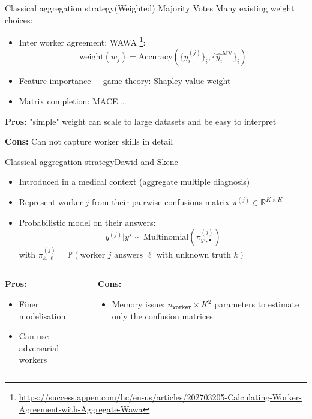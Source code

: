 \begin{frame}{Classical aggregation strategy}{(Weighted) Majority Votes}
Many existing weight choices:
\begin{itemize}[itemsep=15pt]
    \item Inter worker agreement: WAWA \footnote{\url{https://success.appen.com/hc/en-us/articles/202703205-Calculating-Worker-Agreement-with-Aggregate-Wawa}}:
    \[
    \mathrm{weight}(w_j) = \mathrm{Accuracy}(\{y_i^{(j)}\}_i, \{\hat {y_i}^\mathrm{MV}\}_i)
    \]
    \item Feature importance + game theory: Shapley-value weight
    \item Matrix completion: MACE \dots
\end{itemize}
\vspace{1cm}
\textbf{Pros:} "simple" weight can scale to large datasets and be easy to interpret

\textbf{Cons:} Can not capture worker skills in detail
\end{frame}


\begin{frame}{Classical aggregation strategy}{Dawid and Skene}
\begin{itemize}
    \item Introduced in a medical context (aggregate multiple diagnosis)
    \item Represent worker $j$ from their pairwise confusions matrix $\pi^{(j)}\in\mathbb{R}^{K\times K}$
    \item Probabilistic model on their answers:
    \[
    y^{(j)} | y^\star \sim \mathrm{Multinomial}(\pi^{(j)}_{y^\star, \bullet})
    \]
    with $\pi^{(j)}_{k,\ell}=\mathbb{P}(\text{worker }j \text{ answers }\ell \text{ with unknown truth } k)$
\end{itemize}
\vspace{.5cm}
\begin{columns}
    \begin{column}{.45\textwidth}
    \textbf{Pros:}
    \begin{itemize}
        \item Finer modelisation
        \item Can use adversarial workers
    \end{itemize}
    \end{column}
    \begin{column}{.45\textwidth}
        \textbf{Cons:}
        \begin{itemize}
            \item Memory issue: $n_{\texttt{worker}}\times K^2$ parameters to estimate only the confusion matrices
        \end{itemize}
    \end{column}
\end{columns}
\end{frame}

